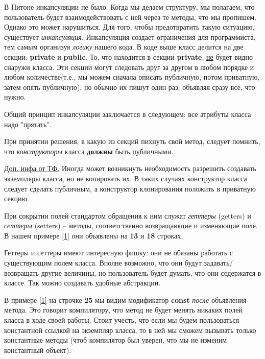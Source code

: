 \begin{lecture}[\lectureSubject]
	\begin{lecSection}
		В Питоне инкапсуляции не было. Когда мы делаем структуру, мы полагаем, что пользователь будет взаимодействовать с ней через те методы, что мы пропишем. Однако это может нарушиться. Для того, чтобы предотвратить такую ситуацию, существует \textit{инкапсуляция}. Инкапсуляция создает ограничения для программиста, тем самым организуя \textit{логику} нашего кода.
		В коде выше класс делится на две секции: \textbf{private} и \textbf{public}. То, что находится в секции \textbf{private}, \underline{не} будет видно снаружи класса. Эти секции могут следовать друг за другом в любом порядке и любом количестве(т.е., мы можем сначала описать публичную, потом приватную, затем опять публичную), но обычно их пишут один раз, объявляя сразу все, что нужно.
		
		Общий принцип инкапсуляции заключается в следующем: все атрибуты класса надо "прятать".
		
		При принятии решения, в какую из секций пихнуть свой метод, следует помнить, что \textit{конструкторы} класса \textbf{должны} быть публичными.
		
		\underline{Доп. инфа от ТФ.} Иногда может возникнуть необходимость разрешить создавать экземпляры класса, но не копировать их. В таких случаях конструктор класса следует сделать публичным, а конструктор клонирования положить в приватную секцию.
		\end{lecSection}
		
		\begin{lecSection}
		
		При сокрытии полей стандартом обращения к ним служат \textit{геттеры} (getters) и \textit{сеттеры} (setters) -- методы, соответственно возвращающие и изменяющие поле. В нашем примере \ref{1} они объявлены на \textbf{13} и \textbf{18} строках.
		
		 Геттеры и сеттеры имеют интересную фишку: они не обязаны работать с существующим полем класса. Вполне возможно, что они будут задавать/возвращать другие величины, но пользователь будет думать, что они содержатся в классе. Так можно создавать удобные абстракции.
		
		\end{lecSection}
		
		\begin{lecSection}
			В примере \ref{1} на строчке \textbf{25} мы видим модификатор \textbf{const} \textit{после} объявления метода. Это говорит компилятору, что метод не будет менять никаких полей класса в ходе своей работы. Стоит учесть, что если мы будем пользоваться константной ссылкой на экземпляр класса, то в ней мы сможем вызывать только константные методы (чтоб компилятор был уверен, что мы не изменим константный объект).
		\end{lecSection}
		

\end{lecture}
